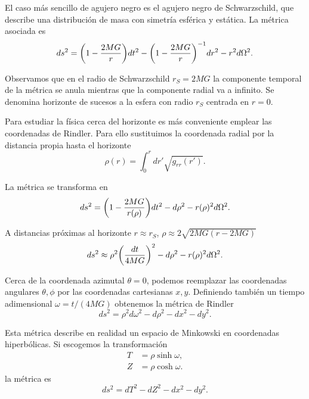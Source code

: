 

El caso más sencillo de agujero negro es el agujero negro de Schwarzschild, que
describe una distribución de masa con simetría esférica y estática. La métrica asociada
es 
\begin{equation}
  ds^2= \qty(1-\frac{2MG}{r})dt^2-\qty(1-\frac{2MG}{r})^{-1}dr^2-r^2d\Omega^2.
\end{equation}

Observamos que en el radio de Schwarzschild $r_S=2MG$ la componente temporal de la 
métrica se anula mientras que la componente radial va a infinito.
Se denomina horizonte de sucesos a la esfera con radio $r_S$ centrada en $r=0$.

Para estudiar la física cerca del horizonte es más conveniente emplear las coordenadas
de Rindler. Para ello sustituimos la coordenada radial por la distancia propia hasta
el horizonte
\begin{equation}
  \rho(r)=\int_0^r dr' \sqrt{g_{rr}(r')}.
\end{equation}

La métrica se transforma en 
\begin{equation}
  ds^2=\qty(1-\frac{2MG}{r(\rho)})dt^2-d\rho^2-r(\rho)^2d\Omega^2.
\end{equation}

A distancias próximas al horizonte $r\approx r_S$, $\rho\approx 2\sqrt{2MG(r-2MG)}$
\begin{equation}
  ds^2\approx \rho^2\qty(\frac{dt}{4MG})^2 -d\rho^2-r(\rho)^2d\Omega^2.
\end{equation}

Cerca de la coordenada azimutal $\theta=0$, podemos reemplazar las coordenadas
angulares $\theta,\phi$ por las coordenadas cartesianas $x,y$. Definiendo
también un tiempo adimensional $\omega=t/(4MG)$ obtenemos la métrica de Rindler
\begin{equation}
  ds^2=\rho^2d\omega^2 -d\rho^2 -dx^2-dy^2.
\end{equation}

Esta métrica describe en realidad un espacio de Minkowski en coordenadas hiperbólicas.
Si escogemos la transformación
\begin{align}
  T&=\rho \sinh \omega, \\
  Z&=\rho \cosh \omega.
\end{align}
la métrica es
\begin{equation}
  ds^2=dT^2-dZ^2-dx^2-dy^2.
\end{equation}

